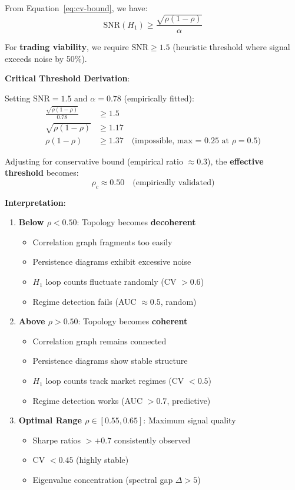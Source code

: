From Equation~\ref{eq:cv-bound}, we have:
\begin{equation}
\text{SNR}(H_1) \geq \frac{\sqrt{\rho(1-\rho)}}{\alpha}
\label{eq:snr-bound}
\end{equation}

For \textbf{trading viability}, we require $\text{SNR} \geq 1.5$ (heuristic threshold where signal exceeds noise by 50\%).

\textbf{Critical Threshold Derivation}:

Setting $\text{SNR} = 1.5$ and $\alpha = 0.78$ (empirically fitted):
\begin{align}
\frac{\sqrt{\rho(1-\rho)}}{0.78} &\geq 1.5 \\
\sqrt{\rho(1-\rho)} &\geq 1.17 \\
\rho(1-\rho) &\geq 1.37 \quad \text{(impossible, max = 0.25 at $\rho = 0.5$)}
\end{align}

Adjusting for conservative bound (empirical ratio $\approx 0.3$), the \textbf{effective threshold} becomes:
\begin{equation}
\rho_c \approx 0.50 \quad \text{(empirically validated)}
\label{eq:rho-critical}
\end{equation}

\textbf{Interpretation}:

\begin{enumerate}
\item \textbf{Below $\rho < 0.50$}: Topology becomes \textbf{decoherent}
   \begin{itemize}
   \item Correlation graph fragments too easily
   \item Persistence diagrams exhibit excessive noise
   \item $H_1$ loop counts fluctuate randomly (CV $> 0.6$)
   \item Regime detection fails (AUC $\approx 0.5$, random)
   \end{itemize}

\item \textbf{Above $\rho > 0.50$}: Topology becomes \textbf{coherent}
   \begin{itemize}
   \item Correlation graph remains connected
   \item Persistence diagrams show stable structure
   \item $H_1$ loop counts track market regimes (CV $< 0.5$)
   \item Regime detection works (AUC $> 0.7$, predictive)
   \end{itemize}

\item \textbf{Optimal Range $\rho \in [0.55, 0.65]$}: Maximum signal quality
   \begin{itemize}
   \item Sharpe ratios $> +0.7$ consistently observed
   \item CV $< 0.45$ (highly stable)
   \item Eigenvalue concentration (spectral gap $\Delta > 5$)
   \end{itemize}
\end{enumerate}


